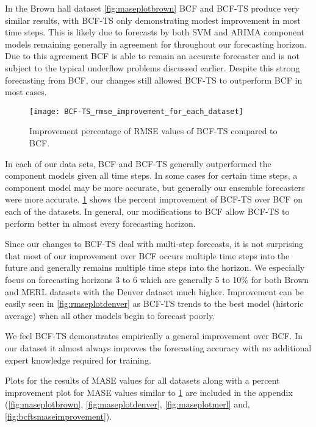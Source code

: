 In the Brown hall dataset \ref{fig:maseplotbrown} BCF and BCF-TS produce very similar results, with BCF-TS only demonstrating modest improvement in most time steps.  This is likely due to forecasts by both SVM and ARIMA component models remaining generally in agreement for throughout our forecasting horizon.  Due to this agreement BCF is able to remain an accurate forecaster and is not subject to the typical underflow problems discussed earlier.  Despite this strong forecasting from BCF, our changes still allowed BCF-TS to outperform BCF in most cases.

\begin{figure}[!h]
	\begin{center}
		\texttt{[image: BCF-TS\_rmse\_improvement\_for\_each\_dataset]}
	\end{center}
	\caption{Improvement percentage of RMSE values of BCF-TS compared to BCF.}
	\label{fig:bcftsrmseimprovement}
\end{figure}

In each of our data sets, BCF and BCF-TS generally outperformed the component models given all time steps.  In some cases for certain time steps, a component model may be more accurate, but generally our ensemble forecasters were more accurate.  \ref{fig:bcftsrmseimprovement} shows the percent improvement of BCF-TS over BCF on each of the datasets.  In general, our modifications to BCF allow BCF-TS to perform better in almost every forecasting horizon.  

Since our changes to BCF-TS deal with multi-step forecasts, it is not surprising that most of our improvement over BCF occurs multiple time steps into the future and generally remains multiple time steps into the horizon.  We especially focus on forecasting horizons 3 to 6 which are generally 5 to 10\% for both Brown and MERL datasets with the Denver dataset much higher.   Improvement can be easily seen in \ref{fig:rmseplotdenver} as BCF-TS trends to the best model (historic average) when all other models begin to forecast poorly.

We feel BCF-TS demonstrates empirically a general improvement over BCF.  In our dataset it almost always improves the forecasting accuracy with no additional expert knowledge required for training.

Plots for the results of MASE values for all datasets along with a percent improvement plot for MASE values similar to \ref{fig:bcftsrmseimprovement} are included in the appendix (\ref{fig:maseplotbrown}, \ref{fig:maseplotdenver}, \ref{fig:maseplotmerl} and, \ref{fig:bcftsmaseimprovement}).


